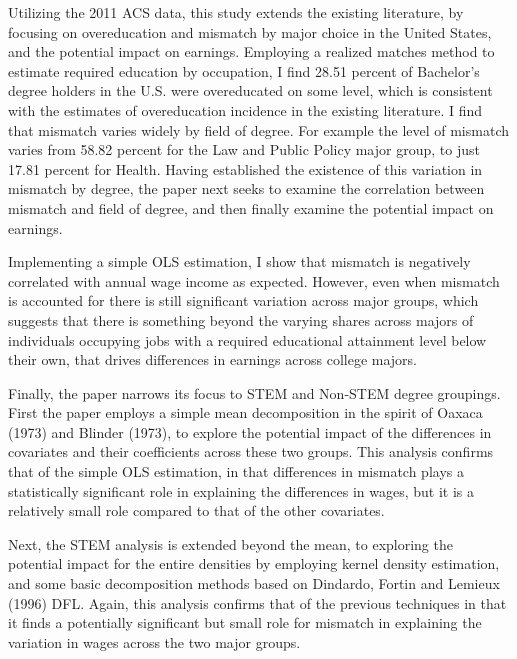 \documentclass[11pt]{article}
\theoremstyle{definition}
\begin{document}
\vspace{2mm}
Utilizing the 2011 ACS data, this study extends the existing literature, by focusing on overeducation and mismatch by major choice in the United States, and the potential impact on earnings.  Employing a realized matches method to estimate required education by occupation, I find 28.51 percent of Bachelor's degree holders in the U.S. were overeducated on some level, which is consistent with the estimates of overeducation incidence in the existing literature.  I find that mismatch varies widely by field of degree.  For example the level of mismatch varies from 58.82 percent for the Law and Public Policy major group, to just 17.81 percent for Health.  Having established the existence of this variation in mismatch by degree, the paper next seeks to examine the correlation between mismatch and field of degree, and then finally examine the potential impact on earnings.

Implementing a simple OLS estimation, I show that mismatch is negatively correlated with annual wage income as expected.  However, even when mismatch is accounted for there is still significant variation across major groups, which suggests that there is something beyond the varying shares across majors of individuals occupying jobs with a required educational attainment level below their own, that drives differences in earnings across college majors.   

\vspace{2mm}
Finally, the paper narrows its focus to STEM and Non-STEM degree groupings.  First the paper employs a simple mean decomposition in the spirit of Oaxaca (1973) and Blinder (1973), to explore the potential impact of the differences in covariates and their coefficients across these two groups.  This analysis confirms that of the simple OLS estimation, in that differences in mismatch plays a statistically significant role in explaining the differences in wages, but it is a relatively small role compared to that of the other covariates.   

Next, the STEM analysis is extended beyond the mean, to exploring the potential impact for the entire densities by employing kernel density estimation, and some basic decomposition methods based on Dindardo, Fortin and Lemieux (1996) DFL.  Again, this analysis confirms that of the previous techniques in that it finds a potentially significant but small role for mismatch in explaining the variation in wages across the two major groups.  
\end{document}
